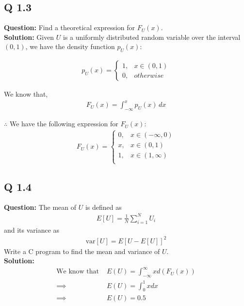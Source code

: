 \documentclass[journal,12pt,twocolumn]{IEEEtran}
\providecommand{\sbrak}[1]{\ensuremath{{}\left[#1\right]}}
\begin{document}
\subsection{Q 1.3}
\noindent\textbf{Question:} Find a  theoretical expression for $F_{U}(x)$.\\
\textbf{Solution:} Given $U$ is a uniformly distributed random variable over the interval $(0, 1)$, we have the density function $p_U(x)$:

\begin{align}
	p_U(x) =
            \begin{cases}
    		1, & x \in (0, 1) \\
    		0, & otherwise
	    \end{cases}
    	\label{eq:PDF}
\end{align}

We know that,
\begin{align}
    F_U(x) = \int_{-\infty}^{x} p_U(x) \,dx
    \label{eq:Relation}
\end{align}

\noindent $\therefore$ We have the following expression for $F_U(x)$:
\begin{align}
    F_U(x) =
	    \begin{cases}
	    	0, & x \in (-\infty, 0) \\
  	    	x, & x \in (0, 1) \\
    		1, & x \in (1, \infty)\\
            \end{cases}
\end{align}



\subsection{Q 1.4}
\noindent\textbf{Question:} The mean of $U$ is defined as
%
\begin{align}
E\sbrak{U} = \frac{1}{N}\sum_{i=1}^{N}U_i
\end{align}
%
and its variance as
%
\begin{align}
\text{var}\sbrak{U} = E\sbrak{U- E\sbrak{U}}^2 
\end{align}
Write a C program to  find the mean and variance of $U$.\\ 


\noindent \textbf{Solution:}\\
\begin{align}
    \text{We know that }&E(U) = \int _ {-\infty} ^ {\infty} {x d(F_U(x))}\\
    \implies &E(U) = \int _ {0} ^ {1} {x dx}\\
    \implies &E(U) = 0.5
\end{align}
\end{document}
